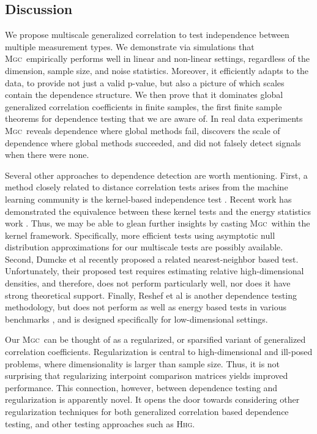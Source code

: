\documentclass[11pt]{article}
\providecommand{\sct}[1]{{\normalfont\textsc{#1}}}
\newcommand{\Mgc}{\sct{Mgc}}
\newcommand{\Hhg}{\sct{Hhg}}
\begin{document}
\subsection*{Discussion}
\label{conclu}

We propose multiscale generalized correlation to test independence between multiple measurement types.
We demonstrate via simulations that \Mgc~empirically performs well in linear and non-linear settings, regardless of the dimension, sample size, and noise statistics.  Moreover, it efficiently adapts to the data, to provide not just a valid p-value, but also a picture of which scales contain the dependence structure. We then prove that it dominates global generalized correlation coefficients in finite samples, the first finite sample theorems for dependence testing that we are aware of.  
In real data experiments \Mgc~reveals dependence where global methods fail, discovers the scale of dependence where global methods succeeded, and did not falsely detect signals when there were none.


Several other approaches to dependence detection are worth mentioning.
First, a method closely related to distance correlation tests arises from the machine learning community is the kernel-based independence test  \cite{GrettonEtAl2005, GrettonGyorfi2010, GrettonEtAl2012}.  Recent work has demonstrated the equivalence between these kernel tests and the energy statistics work \cite{SejdinovicEtAl2013, RamdasEtAl2015}. Thus, we may be able to glean further insights by casting \Mgc~within the kernel framework. Specifically, more efficient tests using asymptotic null distribution approximations for our multiscale tests are possibly available.
Second, Dumcke et al \cite{Dumcke2014} recently proposed a related nearest-neighbor based test.  Unfortunately, their proposed test requires estimating relative high-dimensional densities, and therefore, does not perform particularly well, nor does it have strong theoretical support.
Finally, Reshef et al \cite{Reshef2011} is another dependence testing methodology, but does not perform as well as energy based tests in various benchmarks \cite{SimonTibshirani2012}, and is designed specifically for low-dimensional settings.

Our \Mgc~can be thought of as a regularized, or sparsified variant of generalized correlation coefficients.  Regularization is central to high-dimensional and ill-posed problems, where dimensionality is larger than sample size.  Thus, it is not surprising that regularizing interpoint comparison matrices yields improved performance.  This connection, however, between dependence testing and regularization is apparently novel.  It opens the door towards considering other regularization techniques for both generalized correlation based dependence testing, and other testing approaches such as \Hhg. 
\end{document}
